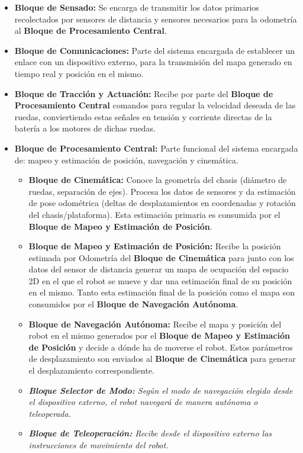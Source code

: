 \documentclass[12pt,a4paper]{article}
\begin{document}
\begin{itemize}
    \item \textbf{Bloque de Sensado:} Se encarga de transmitir los datos primarios recolectados por sensores de distancia y sensores necesarios para la odometría al \textbf{Bloque de Procesamiento Central}.
    \item \textbf{Bloque de Comunicaciones:} Parte del sistema encargada de establecer un enlace con un dispositivo externo, para la transmisión del mapa generado en tiempo real y posición en el mismo.


    \item \textbf{Bloque de Tracción y Actuación:} Recibe por parte del \textbf{Bloque de Procesamiento Central} comandos para regular la velocidad deseada de las ruedas, conviertiendo estas señales en tensión y corriente directas de la batería a los motores de dichas ruedas.
    \item \textbf{Bloque de Procesamiento Central:} Parte funcional del sistema encargada de: mapeo y estimación de posición, navegación y cinemática.

    \begin{itemize}
        \item \textbf{Bloque de Cinemática:} Conoce la geometría del chasis (diámetro de ruedas, separación de ejes). Procesa los datos de sensores y da estimación de pose odométrica (deltas de desplazamientos en coordenadas y rotación del chasis/plataforma). Esta estimación primaria es consumida por el \textbf{Bloque de Mapeo y Estimación de Posición}.
        \item \textbf{Bloque de Mapeo y Estimación de Posición:} Recibe la posición estimada por Odometría del \textbf{Bloque de Cinemática} para junto con los datos del sensor de distancia generar un mapa de ocupación del espacio 2D en el que el robot se mueve y dar una estimación final de su posición en el mismo. Tanto esta estimación final de la posición como el mapa son consumidos por el \textbf{Bloque de Navegación Autónoma}.
        \item \textbf{Bloque de Navegación Autónoma:} Recibe el mapa y posición del robot en el mismo generados por el \textbf{Bloque de Mapeo y Estimación de Posición} y decide a dónde ha de moverse el robot. Estos parámetros de desplazamiento son enviados al \textbf{Bloque de Cinemática} para generar el desplazamiento correspondiente.
        \item \textit{\textbf{Bloque Selector de Modo:} Según el modo de navegación elegido desde el dispositivo externo, el robot navegará de manera autónoma o teleoperada.}
        \item \textit{\textbf{Bloque de Teleoperación:} Recibe desde el dispositivo externo las instrucciones de movimiento del robot.}
    \end{itemize}


\end{itemize}
\end{document}
